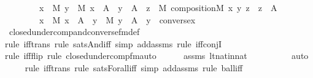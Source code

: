 \begin{isabellebody}
\ \ \ \ \ \ \ \ {\isacharparenleft}{\kern0pt}{\isasymforall}x\ {\isasymin}\ M{\isachardot}{\kern0pt}\ {\isasymforall}y\ {\isasymin}\ M{\isachardot}{\kern0pt}\ x\ {\isasymin}\ A\ {\isasymlongrightarrow}\ y\ {\isasymin}\ A\ {\isasymlongrightarrow}\ {\isacharparenleft}{\kern0pt}{\isasymexists}z\ {\isasymin}\ M{\isachardot}{\kern0pt}\ composition{\isacharparenleft}{\kern0pt}{\isacharhash}{\kern0pt}{\isacharhash}{\kern0pt}M{\isacharcomma}{\kern0pt}\ x{\isacharcomma}{\kern0pt}\ y{\isacharcomma}{\kern0pt}\ z{\isacharparenright}{\kern0pt}\ {\isasymand}\ z\ {\isasymin}\ A{\isacharparenright}{\kern0pt}{\isacharparenright}{\kern0pt}\ {\isasymand}\ \isanewline
\ \ \ \ \ \ \ \ {\isacharparenleft}{\kern0pt}{\isasymforall}x\ {\isasymin}\ M{\isachardot}{\kern0pt}\ x\ {\isasymin}\ A\ {\isasymlongrightarrow}\ {\isacharparenleft}{\kern0pt}{\isasymexists}y\ {\isasymin}\ M{\isachardot}{\kern0pt}\ y\ {\isasymin}\ A\ {\isasymand}\ y\ {\isacharequal}{\kern0pt}\ converse{\isacharparenleft}{\kern0pt}x{\isacharparenright}{\kern0pt}{\isacharparenright}{\kern0pt}{\isacharparenright}{\kern0pt}{\isachardoublequoteclose}\isanewline
\ \ \ \ \isamarkupfalse%
\ closed{\isacharunderscore}{\kern0pt}under{\isacharunderscore}{\kern0pt}comp{\isacharunderscore}{\kern0pt}and{\isacharunderscore}{\kern0pt}converse{\isacharunderscore}{\kern0pt}fm{\isacharunderscore}{\kern0pt}def\ \isanewline
\ \ \ \ \isamarkupfalse%
{\isacharparenleft}{\kern0pt}rule\ iff{\isacharunderscore}{\kern0pt}trans{\isacharcomma}{\kern0pt}\ rule\ sats{\isacharunderscore}{\kern0pt}And{\isacharunderscore}{\kern0pt}iff{\isacharcomma}{\kern0pt}\ simp\ add{\isacharcolon}{\kern0pt}assms{\isacharcomma}{\kern0pt}\ rule\ iff{\isacharunderscore}{\kern0pt}conjI{\isacharparenright}{\kern0pt}\isanewline
\ \ \ \ \isamarkupfalse%
{\isacharparenleft}{\kern0pt}rule\ iff{\isacharunderscore}{\kern0pt}flip{\isacharcomma}{\kern0pt}\ rule\ closed{\isacharunderscore}{\kern0pt}under{\isacharunderscore}{\kern0pt}comp{\isacharunderscore}{\kern0pt}fm{\isacharunderscore}{\kern0pt}auto{\isacharparenright}{\kern0pt}\isanewline
\ \ \ \ \isamarkupfalse%
\ assms\ lt{\isacharunderscore}{\kern0pt}nat{\isacharunderscore}{\kern0pt}in{\isacharunderscore}{\kern0pt}nat\ \isanewline
\ \ \ \ \ \ \ \isamarkupfalse%
\ auto{\isacharbrackleft}{\kern0pt}{}{\isacharbrackright}{\kern0pt}\isanewline
\ \ \ \ \isamarkupfalse%
{\isacharparenleft}{\kern0pt}rule\ iff{\isacharunderscore}{\kern0pt}trans{\isacharcomma}{\kern0pt}\ rule\ sats{\isacharunderscore}{\kern0pt}Forall{\isacharunderscore}{\kern0pt}iff{\isacharcomma}{\kern0pt}\ simp\ add{\isacharcolon}{\kern0pt}assms{\isacharcomma}{\kern0pt}\ rule\ ball{\isacharunderscore}{\kern0pt}iff{\isacharparenright}{\kern0pt}\isanewline

\end{isabellebody}
